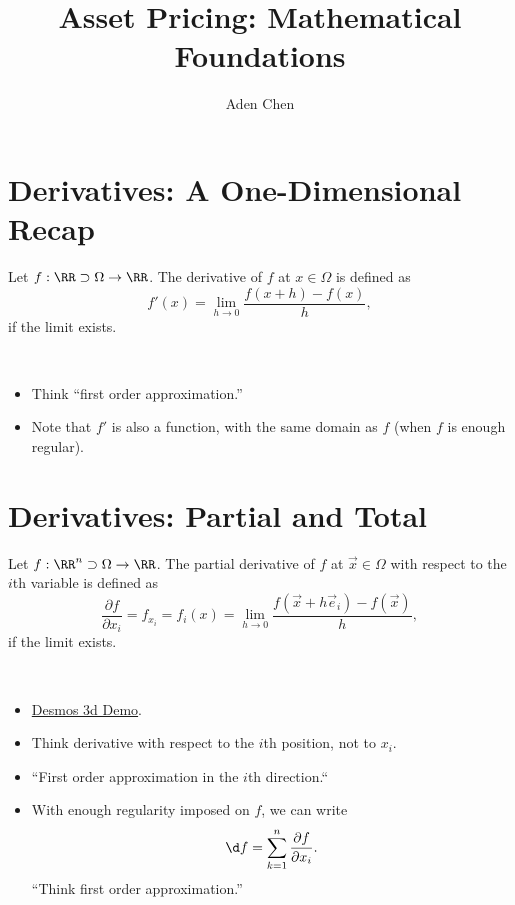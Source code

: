 \documentclass[oneside,reqno,letterpaper]{amsart}
\title[AP-Lec01]{Asset Pricing: Mathematical Foundations}
\author{Aden Chen}
\begin{document}
\maketitle

\tableofcontents

\section{Derivatives: A One-Dimensional Recap}




\begin{definition}
  Let \(f: \RR \supset \Omega \to \RR\). 
  The derivative of \(f\) at \(x \in \Omega\) is defined as 
  \[
    f'(x) = \lim_{h \to 0} \frac{f(x + h) - f(x)}{h} , 
  \] 
  if the limit exists. 
\end{definition}
\begin{remark}~
  \begin{itemize}
    \item Think ``first order approximation.''
    \item Note that \(f'\) is also a function, with the same domain as \(f\) (when \(f\) is enough regular). 
  \end{itemize}
\end{remark}



\section{Derivatives: Partial and Total}
\begin{definition}
  Let \(f: \RR^n \supset \Omega \to \RR\). 
  The partial derivative of \(f\) at \(\vec{x} \in \Omega\) with respect to the \(i\)th variable is defined as 
  \[
    \frac{\partial f}{\partial x_i}
    = f_{x_i}
    = f_i(x) 
    = \lim_{h \to 0} \frac{f(\vec{x} + h \vec{e}_i) - f(\vec{x})}{h} , 
  \] 
  if the limit exists. 
\end{definition}
\begin{remark}~
  \begin{itemize}
    \item \href{https://www.desmos.com/3d/qvhgjqbkax}{Desmos 3d Demo}. 
    \item Think derivative with respect to the \(i\)th position, not to \(x_i\). 
    \item ``First order approximation in the \(i\)th direction.``
    \item With enough regularity imposed on \(f\), we can write 
      \[
        \d f = \sum_{k = 1}^{n} \frac{\partial f}{\partial x_i} . 
      \] 
      ``Think first order approximation.''
  \end{itemize}
\end{remark}
\end{document}
